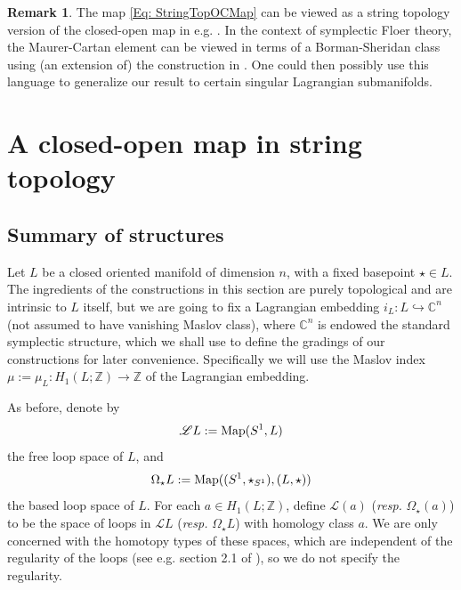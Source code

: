 \documentclass[10pt]{amsart}
\numberwithin{equation}{section}
\theoremstyle{plain}
\theoremstyle{definition}
\newtheorem{remark}[theorem]{Remark}
\theoremstyle{remark}
\numberwithin{equation}{section}
\newcommand{\Z}{\mathbb{Z}}
\newcommand{\C}{\mathbb{C}}
\newcommand{\ms}[1]{\mathscr{#1}}
\begin{document}
{\begin{remark}
	The map \eqref{Eq: StringTopOCMap} can be viewed as a string topology version of the closed-open map in e.g. \cite{AbouzaidGeneration,GanatraThesis}. In the context of symplectic Floer theory, the Maurer-Cartan element can be viewed in terms of a Borman-Sheridan class using (an extension of) the construction in \cite{BormanSheridan}. One could then possibly use this language to generalize our result to certain singular Lagrangian submanifolds.
\end{remark}








\bigskip


\section{A closed-open map in string topology}
\label{Sec: CO map}

\subsection{Summary of structures}
Let $L$ be a closed oriented manifold of dimension $n$, with a fixed basepoint $\star \in L$.  
The ingredients of the constructions in this section are purely topological and are intrinsic to $L$ itself, but we are going to fix a Lagrangian embedding $i_L\colon L\hookrightarrow \C^n$ (not assumed to have vanishing Maslov class), where $\C^n$ is endowed the standard symplectic structure, which we shall use to define the gradings of our constructions for later convenience.
Specifically we will use the Maslov index $\mu:=\mu_L\colon H_1(L;\Z)\to \Z$ of the Lagrangian embedding.


As before, denote by 
\[
	\mathscr{L}L:= \textup{Map}(S^1,L)
\]
the free loop space of $L$, and 
\[
	\Omega_{\star} L:= \textup{Map}((S^1,\star_{S^1}), (L,\star))
\]
the based loop space of $L$.
For each $a\in H_1(L;\Z)$, define $\ms{L}(a)$ (\emph{resp.} $\Omega_\star (a)$) to be the space of loops in $\ms{L}L$ (\emph{resp.} $\Omega_\star L$) with homology class $a$.
We are only concerned with the homotopy types of these spaces, which are independent of the regularity of the loops (see e.g. section 2.1 of \cite{ChataurOanceaBasic}), so we do not specify the regularity.




}
\end{document}
